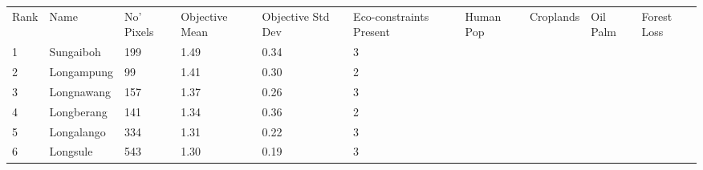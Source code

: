 \begin{table}[ht]
\centering
\begingroup\fontsize{9pt}{10pt}\selectfont
\begin{tabular}{C{0.05\textwidth}C{0.15\textwidth}C{0.08\textwidth}C{0.08\textwidth}C{0.08\textwidth}C{0.08\textwidth}C{0.08\textwidth}C{0.08\textwidth}C{0.08\textwidth}C{0.08\textwidth}}
 Rank & Name & No' Pixels & Objective Mean & Objective Std Dev & Eco-constraints  Present & Human Pop & Croplands & Oil Palm & Forest Loss \\ 
 {1} & Sungaiboh & 199 & \textcolor[HTML]{FFFFFF}{1.49} & \textcolor[HTML]{FFFFFF}{0.34} & \textcolor[HTML]{FFFFFF}{3} &  &  &  &  \\ 
  {2} & Longampung &  99 & \textcolor[HTML]{FFFFFF}{1.41} & \textcolor[HTML]{000000}{0.30} & \textcolor[HTML]{000000}{2} &  &  &  &  \\ 
  {3} & Longnawang & 157 & \textcolor[HTML]{FFFFFF}{1.37} & \textcolor[HTML]{000000}{0.26} & \textcolor[HTML]{FFFFFF}{3} &  &  &  &  \\ 
  {4} & Longberang & 141 & \textcolor[HTML]{FFFFFF}{1.34} & \textcolor[HTML]{FFFFFF}{0.36} & \textcolor[HTML]{000000}{2} &  &  &  &  \\ 
  {5} & Longalango & 334 & \textcolor[HTML]{FFFFFF}{1.31} & \textcolor[HTML]{000000}{0.22} & \textcolor[HTML]{FFFFFF}{3} &  &  &  &  \\ 
  {6} & Longsule & 543 & \textcolor[HTML]{FFFFFF}{1.30} & \textcolor[HTML]{000000}{0.19} & \textcolor[HTML]{FFFFFF}{3} &  &  &  &  \\ 

\end{tabular}
\end{table}
